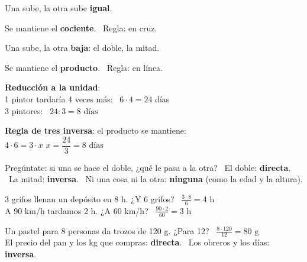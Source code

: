 \documentclass[11pt,a4paper]{article}
\newcommand{\cA}[1]{{\color{fmA}#1}}\newcommand{\cB}[1]{{\color{fmB}#1}}\newcommand{\cK}[1]{{\color{fmK}#1}}\newcommand{\cR}[1]{{\color{fmR}#1}}\newcommand{\cV}[1]{{\color{fmV}#1}}
\begin{document}
\vfill
\begin{tcbraster}[raster columns=2,raster equal height,raster column skip=10pt]
\begin{tcolorbox}[fmbase,colback=fmK!8,colframe=fmK,coltitle=white,title={\faArrowUp\ \ Directa}]
Una sube, la otra sube \textbf{igual}.\par\smallskip
Se mantiene el \textbf{cociente}. \ Regla: en cruz.
\end{tcolorbox}
\begin{tcolorbox}[fmbase,colback=fmB!8,colframe=fmB,coltitle=white,title={\faArrowDown\ \ Inversa}]
Una sube, la otra \textbf{baja}: el doble, la mitad.\par\smallskip
Se mantiene el \textbf{producto}. \ Regla: en línea.
\end{tcolorbox}
\end{tcbraster}

\vfill
\begin{exemple}
\begin{minipage}[t]{0.48\linewidth}
\textbf{\cA{Reducción a la unidad}}:\\[3pt]
1 pintor tardaría 4 veces más: \ $6\cdot4=24$ días\\[2pt]
3 pintores: \ $24:3=\boxed{8\text{ días}}$
\end{minipage}\hfill
\begin{minipage}[t]{0.49\linewidth}
\textbf{\cB{Regla de tres inversa}}: el producto se mantiene:\\[3pt]
$4\cdot6=3\cdot x$ \quad $x=\dfrac{24}{3}=\boxed{8\text{ días}}$
\end{minipage}
\end{exemple}

\vfill
\begin{compte}
Pregúntate: si una se hace el doble, ¿qué le pasa a la otra? \ El doble: \textbf{directa}. \ La mitad: \textbf{inversa}. \ Ni una cosa ni la otra: \textbf{ninguna} (como la edad y la altura).
\end{compte}

\vfill
\begin{exemple}[Ejemplos]
\begin{minipage}[t]{0.48\linewidth}
3 grifos llenan un depósito en 8 h. ¿Y 6 grifos? \ $\frac{3\cdot8}{6}=\boxed{4\text{ h}}$\\[4pt]
A 90 km/h tardamos 2 h. ¿A 60 km/h? \ $\frac{90\cdot2}{60}=\boxed{3\text{ h}}$
\end{minipage}\hfill
\begin{minipage}[t]{0.49\linewidth}
Un pastel para 8 personas da trozos de 120 g. ¿Para 12? \ $\frac{8\cdot120}{12}=\boxed{80\text{ g}}$\\[4pt]
El precio del pan y los kg que compras: \textbf{directa}. \ Los obreros y los días: \textbf{inversa}.
\end{minipage}
\end{exemple}
\end{document}
